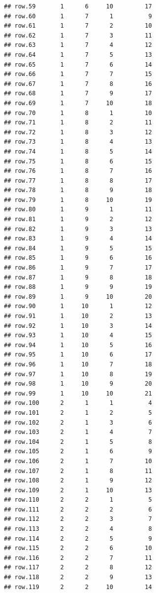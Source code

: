 \documentclass[
]{article}
\begin{document}
\begin{verbatim}
## row.59       1      6     10         17
## row.60       1      7      1          9
## row.61       1      7      2         10
## row.62       1      7      3         11
## row.63       1      7      4         12
## row.64       1      7      5         13
## row.65       1      7      6         14
## row.66       1      7      7         15
## row.67       1      7      8         16
## row.68       1      7      9         17
## row.69       1      7     10         18
## row.70       1      8      1         10
## row.71       1      8      2         11
## row.72       1      8      3         12
## row.73       1      8      4         13
## row.74       1      8      5         14
## row.75       1      8      6         15
## row.76       1      8      7         16
## row.77       1      8      8         17
## row.78       1      8      9         18
## row.79       1      8     10         19
## row.80       1      9      1         11
## row.81       1      9      2         12
## row.82       1      9      3         13
## row.83       1      9      4         14
## row.84       1      9      5         15
## row.85       1      9      6         16
## row.86       1      9      7         17
## row.87       1      9      8         18
## row.88       1      9      9         19
## row.89       1      9     10         20
## row.90       1     10      1         12
## row.91       1     10      2         13
## row.92       1     10      3         14
## row.93       1     10      4         15
## row.94       1     10      5         16
## row.95       1     10      6         17
## row.96       1     10      7         18
## row.97       1     10      8         19
## row.98       1     10      9         20
## row.99       1     10     10         21
## row.100      2      1      1          4
## row.101      2      1      2          5
## row.102      2      1      3          6
## row.103      2      1      4          7
## row.104      2      1      5          8
## row.105      2      1      6          9
## row.106      2      1      7         10
## row.107      2      1      8         11
## row.108      2      1      9         12
## row.109      2      1     10         13
## row.110      2      2      1          5
## row.111      2      2      2          6
## row.112      2      2      3          7
## row.113      2      2      4          8
## row.114      2      2      5          9
## row.115      2      2      6         10
## row.116      2      2      7         11
## row.117      2      2      8         12
## row.118      2      2      9         13
## row.119      2      2     10         14

\end{verbatim}
\end{document}
